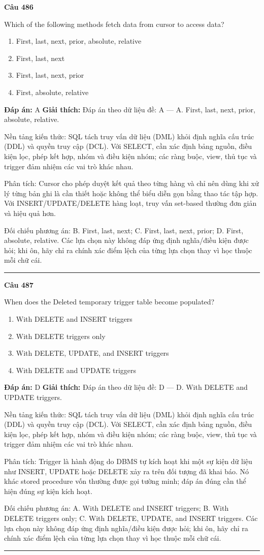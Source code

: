 \documentclass[11pt,a4paper]{article}
\newenvironment{question}[1]{%
  \par\vspace{1em}\noindent\textbf{\large Câu #1}\par\vspace{0.4em}
}{%
  \par\vspace{1em}\hrule\vspace{0.6em}
}
\newenvironment{choices}{%
  \begin{enumerate}[label=\textbf{\Alph*.},leftmargin=2.2em,itemsep=2pt,topsep=3pt]
}{%
  \end{enumerate}
}
\newcommand{\choice}{\item}
\begin{document}
\begin{question}{486}
Which of the following methods fetch data from cursor to access data?
\begin{choices}
\choice First, last, next, prior, absolute, relative
\choice First, last, next
\choice First, last, next, prior
\choice First, absolute, relative
\end{choices}
\textbf{Đáp án:} A
\textbf{Giải thích:} Đáp án theo dữ liệu đề: A — A. First, last, next, prior, absolute, relative.

Nền tảng kiến thức: SQL tách truy vấn dữ liệu (DML) khỏi định nghĩa cấu trúc (DDL) và quyền truy cập (DCL). Với SELECT, cần xác định bảng nguồn, điều kiện lọc, phép kết hợp, nhóm và điều kiện nhóm; các ràng buộc, view, thủ tục và trigger đảm nhiệm các vai trò khác nhau.

Phân tích: Cursor cho phép duyệt kết quả theo từng hàng và chỉ nên dùng khi xử lý từng bản ghi là cần thiết hoặc không thể biểu diễn gọn bằng thao tác tập hợp. Với INSERT/UPDATE/DELETE hàng loạt, truy vấn set-based thường đơn giản và hiệu quả hơn.

Đối chiếu phương án: B. First, last, next; C. First, last, next, prior; D. First, absolute, relative. Các lựa chọn này không đáp ứng định nghĩa/điều kiện được hỏi; khi ôn, hãy chỉ ra chính xác điểm lệch của từng lựa chọn thay vì học thuộc mỗi chữ cái.
\end{question}

\begin{question}{487}
When does the Deleted temporary trigger table become populated?
\begin{choices}
\choice With DELETE and INSERT triggers
\choice With DELETE triggers only
\choice With DELETE, UPDATE, and INSERT triggers
\choice With DELETE and UPDATE triggers
\end{choices}
\textbf{Đáp án:} D
\textbf{Giải thích:} Đáp án theo dữ liệu đề: D — D. With DELETE and UPDATE triggers.

Nền tảng kiến thức: SQL tách truy vấn dữ liệu (DML) khỏi định nghĩa cấu trúc (DDL) và quyền truy cập (DCL). Với SELECT, cần xác định bảng nguồn, điều kiện lọc, phép kết hợp, nhóm và điều kiện nhóm; các ràng buộc, view, thủ tục và trigger đảm nhiệm các vai trò khác nhau.

Phân tích: Trigger là hành động do DBMS tự kích hoạt khi một sự kiện dữ liệu như INSERT, UPDATE hoặc DELETE xảy ra trên đối tượng đã khai báo. Nó khác stored procedure vốn thường được gọi tường minh; đáp án đúng cần thể hiện đúng sự kiện kích hoạt.

Đối chiếu phương án: A. With DELETE and INSERT triggers; B. With DELETE triggers only; C. With DELETE, UPDATE, and INSERT triggers. Các lựa chọn này không đáp ứng định nghĩa/điều kiện được hỏi; khi ôn, hãy chỉ ra chính xác điểm lệch của từng lựa chọn thay vì học thuộc mỗi chữ cái.
\end{question}
\end{document}
